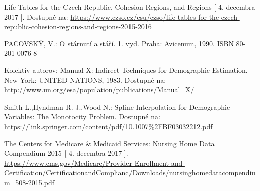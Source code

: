 \documentclass[a4paper, 11pt]{article}
\begin{document}
\begin{thebibliography}{9}
 Life Tables for the Czech Republic, Cohesion Regions, and Regions [ 4. decembra 2017 ]. Dostupné na:
\url{https://www.czso.cz/csu/czso/life-tables-for-the-czech-republic-cohesion-regions-and-regions-2015-2016}

 PACOVSKÝ, V.: O stárnutí a stáří. 1. vyd. Praha: Avicenum, 1990. ISBN 80-201-0076-8

 Kolektív autorov: Manual X: Indirect Techniques for Demographic Estimation. New York: UNITED NATIONS, 1983. Dostupné na:
\url{http://www.un.org/esa/population/publications/Manual_X/}

 Smith L.,Hyndman R. J.,Wood N.: Spline Interpolation for Demographic Variables:
The Monotocity Problem. Dostupné na:
\url{https://link.springer.com/content/pdf/10.1007%2FBF03032212.pdf}

 The Centers for Medicare \& Medicaid Services: Nursing Home Data Compendium 2015 [ 4. decembra 2017 ].
\url{https://www.cms.gov/Medicare/Provider-Enrollment-and-Certification/CertificationandComplianc/Downloads/nursinghomedatacompendium_508-2015.pdf}
\end{thebibliography}
\end{document}
